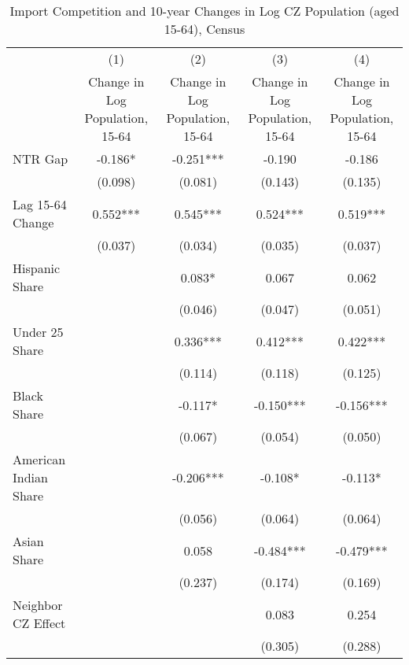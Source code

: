 \begin{table}[htbp]\centering
\def\sym#1{\ifmmode^{#1}\else\(^{#1}\)\fi}
\caption{Import Competition and 10-year Changes in Log CZ Population (aged 15-64), Census}
\begin{tabular}{l*{4}{c}}
\toprule
                    &\multicolumn{1}{c}{(1)}&\multicolumn{1}{c}{(2)}&\multicolumn{1}{c}{(3)}&\multicolumn{1}{c}{(4)}\\
                    &\multicolumn{1}{c}{Change in Log Population, 15-64}&\multicolumn{1}{c}{Change in Log Population, 15-64}&\multicolumn{1}{c}{Change in Log Population, 15-64}&\multicolumn{1}{c}{Change in Log Population, 15-64}\\
\midrule
NTR Gap             &   -0.186*  &   -0.251***&   -0.190   &   -0.186   \\
                    &  (0.098)   &  (0.081)   &  (0.143)   &  (0.135)   \\
\addlinespace
Lag 15-64 Change    &    0.552***&    0.545***&    0.524***&    0.519***\\
                    &  (0.037)   &  (0.034)   &  (0.035)   &  (0.037)   \\
\addlinespace
Hispanic Share      &            &    0.083*  &    0.067   &    0.062   \\
                    &            &  (0.046)   &  (0.047)   &  (0.051)   \\
\addlinespace
Under 25 Share      &            &    0.336***&    0.412***&    0.422***\\
                    &            &  (0.114)   &  (0.118)   &  (0.125)   \\
\addlinespace
Black Share         &            &   -0.117*  &   -0.150***&   -0.156***\\
                    &            &  (0.067)   &  (0.054)   &  (0.050)   \\
\addlinespace
American Indian Share&            &   -0.206***&   -0.108*  &   -0.113*  \\
                    &            &  (0.056)   &  (0.064)   &  (0.064)   \\
\addlinespace
Asian Share         &            &    0.058   &   -0.484***&   -0.479***\\
                    &            &  (0.237)   &  (0.174)   &  (0.169)   \\
\addlinespace
Neighbor CZ Effect  &            &            &    0.083   &    0.254   \\
                    &            &            &  (0.305)   &  (0.288)   \\

\end{tabular}
\end{table}
